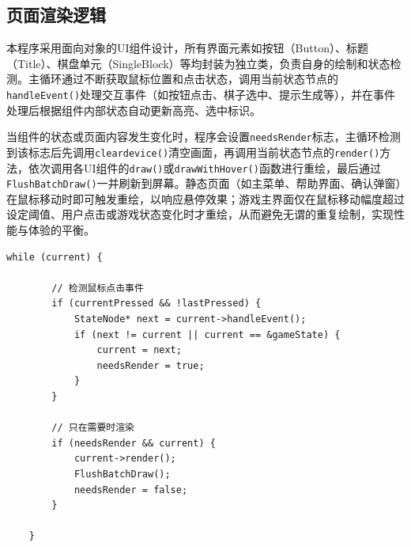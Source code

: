 \documentclass[12pt, a4paper]{article}
\begin{document}
\subsection{页面渲染逻辑}
本程序采用面向对象的UI组件设计，所有界面元素如按钮（Button）、标题（Title）、棋盘单元（SingleBlock）等均封装为独立类，负责自身的绘制和状态检测。主循环通过不断获取鼠标位置和点击状态，调用当前状态节点的\texttt{handleEvent()}处理交互事件（如按钮点击、棋子选中、提示生成等），并在事件处理后根据组件内部状态自动更新高亮、选中标识。

当组件的状态或页面内容发生变化时，程序会设置\texttt{needsRender}标志，主循环检测到该标志后先调用\texttt{cleardevice()}清空画面，再调用当前状态节点的\texttt{render()}方法，依次调用各UI组件的\texttt{draw()}或\texttt{drawWithHover()}函数进行重绘，最后通过\texttt{FlushBatchDraw()}一并刷新到屏幕。静态页面（如主菜单、帮助界面、确认弹窗）在鼠标移动时即可触发重绘，以响应悬停效果；游戏主界面仅在鼠标移动幅度超过设定阈值、用户点击或游戏状态变化时才重绘，从而避免无谓的重复绘制，实现性能与体验的平衡。
\begin{lstlisting}
while (current) {

        // 检测鼠标点击事件
        if (currentPressed && !lastPressed) {
            StateNode* next = current->handleEvent();
            if (next != current || current == &gameState) {
                current = next;
                needsRender = true;
            }
        }
        
        // 只在需要时渲染
        if (needsRender && current) {
            current->render();
            FlushBatchDraw();
            needsRender = false;
        }

    }
\end{lstlisting}
\end{document}
